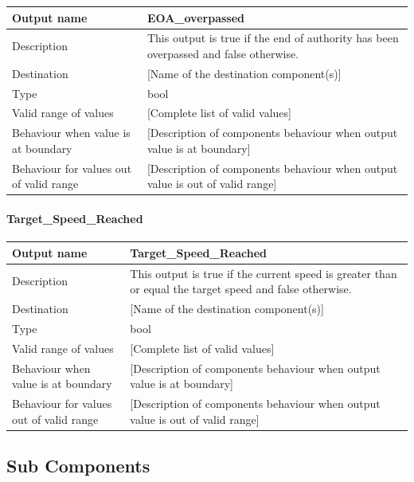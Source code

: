 \begin{longtable}{p{}p{}}
\toprule
Output name				& EOA\_overpassed \\
\midrule
Description				& This output is true if the end of authority has been overpassed and false otherwise. \\
\midrule
Destination				& [Name of the destination component(s)] \\ 
\midrule
Type					& bool \\
\midrule
Valid range of values	& [Complete list of valid values] \\
\midrule
Behaviour when value is at boundary	& [Description of components behaviour when output value is at boundary] \\
\midrule
Behaviour for values out of valid range	& [Description of components behaviour when output value is out of valid range] \\
\bottomrule
\end{longtable}


\paragraph{Target\_Speed\_Reached}

\begin{longtable}{p{}p{}}
\toprule
Output name				& Target\_Speed\_Reached \\
\midrule
Description				& This output is true if the current speed is greater than or equal the target speed and false otherwise. \\
\midrule
Destination				& [Name of the destination component(s)] \\ 
\midrule
Type					& bool \\
\midrule
Valid range of values	& [Complete list of valid values] \\
\midrule
Behaviour when value is at boundary	& [Description of components behaviour when output value is at boundary] \\
\midrule
Behaviour for values out of valid range	& [Description of components behaviour when output value is out of valid range] \\
\bottomrule
\end{longtable}


\subsection{Sub Components}

